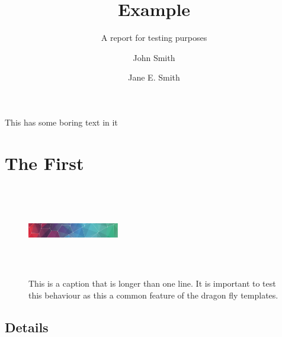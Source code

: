 \documentclass{dragonfly-proposal}
\title{Example}{An Example\\ Report about \emph{sheep}}
\subtitle{A report for testing purposes}
\author{John Smith \and Jane E. Smith}
\begin{document}
\maketitle

\summary%
This has some boring text in it


\section{The First}

\lipsum[1]


\begin{figure}[h]
  \includegraphics[width=40mm,height=40mm]{pattern}
  \caption{This is a caption that is longer than one line. It is important to test 
  this behaviour as this a common feature of the dragon fly templates.}
\end{figure}

\subsection{Details}

\lipsum[2]
\end{document}
